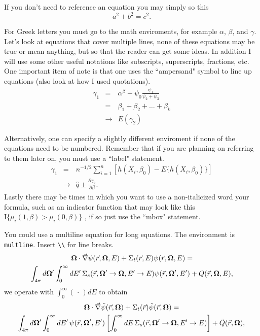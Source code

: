If you don't need to reference an equation you may simply so this 
\[
  a^2 + b^2 = c^2.
\]

For Greek letters you must go to the math enviroments, for example 
$\alpha$, $\beta$, and $\gamma$.  Let's look at equations that cover 
multiple lines, none of these equations may be true or mean anything, but so 
that the reader can get some ideas.  In addition I will use some other useful 
notations like subscripts, superscripts, fractions, etc.  One important item 
of note is that one uses the ``ampersand" symbol to line up equations 
(also look at how I used quotations).
%
\begin{eqnarray}
\gamma_1 & = & \alpha^{\beta} + \psi_0 \frac{\psi_1}{\psi_2+\psi_3} \label{eq.two} \\
& = & \beta_1 + \beta_2 + \ldots + \beta_k \nonumber\\
& \rightarrow & E(\gamma_2) 
\end{eqnarray}

Alternatively, one can specify a slightly different enviroment if none of 
the equations need to be numbered.  Remember that if you are planning on 
referring to them later on, you must use a ``label" statement.
%
\begin{eqnarray*}
\gamma_1 & = & n^{-1/2} \displaystyle \sum_{i=1}^n \left[h(X_i,\beta_0)-E\{h(X_i,\beta_0)\}\right]\\
& \rightarrow & \hat q \pm \frac{\partial \gamma_2}{\partial \beta}. 
\end{eqnarray*}  
Lastly there may be times in which you want to use a non-italicized word 
your formula, such as an indicator function that may look like this 
$\mbox{I}\{\mu_i(1,\beta)>\mu_i(0,\beta)\}$ , if so just use the 
``mbox" statement.


You could use a multiline equation for long equations.  The environment
is \texttt{multline}.  Insert \verb^\\^ for line breaks.
\begin{multline*}
  \boldsymbol{\Omega} \cdot \vec{\nabla} \psi(\vec{r},\boldsymbol{\Omega},E)
   + \Sigma_t(\vec{r},E)\psi(\vec{r},\boldsymbol{\Omega},E) = \\
  \int_{4\pi} d\boldsymbol{\Omega}' \int_0^{\infty} dE' \, 
  \Sigma_s(\vec{r},\boldsymbol{\Omega}'\to\boldsymbol{\Omega},E'\to E)\psi(\vec{r},\boldsymbol{\Omega}',E')
  + Q(\vec{r},\boldsymbol{\Omega},E),
\end{multline*}
we operate with $\displaystyle\int_{0}^{\infty}\left(\,\cdot\,\right) dE$
to obtain
\begin{multline*}
  \boldsymbol{\Omega} \cdot \vec{\nabla} \tilde{\psi}(\vec{r},\boldsymbol{\Omega})
  + \Sigma_t(\vec{r})\tilde{\psi}(\vec{r},\boldsymbol{\Omega}) = \\
  \int_{4\pi} d\boldsymbol{\Omega}' \int_0^{\infty} dE' \, \psi(\vec{r},\boldsymbol{\Omega}',E')
  \left [ \int_{0}^{\infty} dE \, \Sigma_s(\vec{r},\boldsymbol{\Omega}'\to\boldsymbol{\Omega},E'\to E)
  \right ] + \tilde{Q}(\vec{r},\boldsymbol{\Omega}),
\end{multline*}
